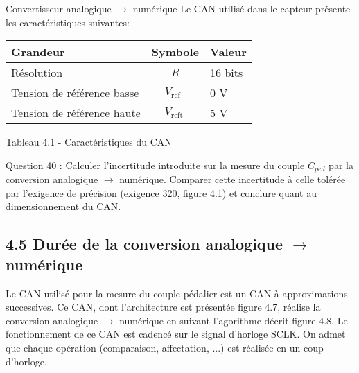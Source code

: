 Convertisseur analogique \(\rightarrow\) numérique Le CAN utilisé dans le capteur présente les caractéristiques suivantes:

\begin{center}
\begin{tabular}{lcl}
Grandeur & Symbole & Valeur \\
\hline
Résolution & \(R\) & 16 bits \\
Tension de référence basse & \(V_{\text {ref- }}\) & 0 V \\
Tension de référence haute & \(V_{\text {reft }}\) & 5 V \\
\hline
\end{tabular}
\end{center}

Tableau 4.1 - Caractéristiques du CAN

Question 40 : Calculer l'incertitude introduite sur la mesure du couple \(C_{p e d}\) par la conversion analogique \(\rightarrow\) numérique. Comparer cette incertitude à celle tolérée par l'exigence de précision (exigence 320, figure 4.1) et conclure quant au dimensionnement du CAN.

\subsection{4.5 Durée de la conversion analogique \(\rightarrow\) numérique}
Le CAN utilisé pour la mesure du couple pédalier est un CAN à approximations successives. Ce CAN, dont l'architecture est présentée figure 4.7, réalise la conversion analogique \(\rightarrow\) numérique en suivant l'agorithme décrit figure 4.8. Le fonctionnement de ce CAN est cadencé sur le signal d'horloge SCLK. On admet que chaque opération (comparaison, affectation, ...) est réalisée en un coup d'horloge.\\

